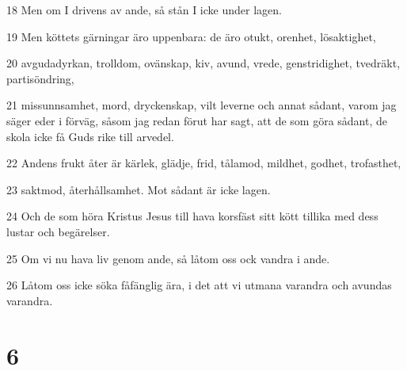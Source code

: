 \par 18 Men om I drivens av ande, så stån I icke under lagen.
\par 19 Men köttets gärningar äro uppenbara: de äro otukt, orenhet, lösaktighet,
\par 20 avgudadyrkan, trolldom, ovänskap, kiv, avund, vrede, genstridighet, tvedräkt, partisöndring,
\par 21 missunnsamhet, mord, dryckenskap, vilt leverne och annat sådant, varom jag säger eder i förväg, såsom jag redan förut har sagt, att de som göra sådant, de skola icke få Guds rike till arvedel.
\par 22 Andens frukt åter är kärlek, glädje, frid, tålamod, mildhet, godhet, trofasthet,
\par 23 saktmod, återhållsamhet. Mot sådant är icke lagen.
\par 24 Och de som höra Kristus Jesus till hava korsfäst sitt kött tillika med dess lustar och begärelser.
\par 25 Om vi nu hava liv genom ande, så låtom oss ock vandra i ande.
\par 26 Låtom oss icke söka fåfänglig ära, i det att vi utmana varandra och avundas varandra.

\chapter{6}

